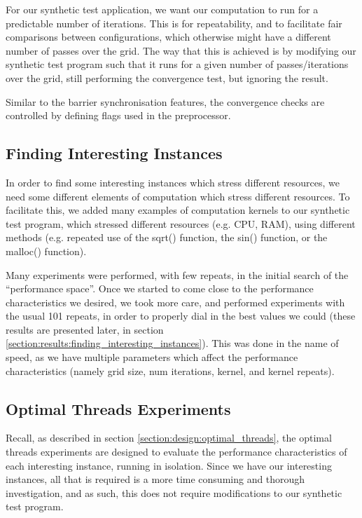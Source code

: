 For our synthetic test application, we want our computation to run for a predictable number of iterations. This is for repeatability, and to facilitate fair comparisons between configurations, which otherwise might have a different number of passes over the grid. The way that this is achieved is by modifying our synthetic test program such that it runs for a given number of passes/iterations over the grid, still performing the convergence test, but ignoring the result.

Similar to the barrier synchronisation features, the convergence checks are controlled by defining flags used in the preprocessor.



\subsection{Finding Interesting Instances}
\label{section:experimental_methodology:finding_interesting_instances}

In order to find some interesting instances which stress different resources, we need some different elements of computation which stress different resources. To facilitate this, we added many examples of computation kernels to our synthetic test program, which stressed different resources (e.g. CPU, RAM), using different methods (e.g. repeated use of the sqrt() function, the sin() function, or the malloc() function).

Many experiments were performed, with few repeats, in the initial search of the ``performance space''. Once we started to come close to the performance characteristics we desired, we took more care, and performed experiments with the usual 101 repeats, in order to properly dial in the best values we could (these results are presented later, in section \ref{section:results:finding_interesting_instances}). This was done in the name of speed, as we have multiple parameters which affect the performance characteristics (namely grid size, num iterations, kernel, and kernel repeats).



\subsection{Optimal Threads Experiments}
\label{section:experimental_methodology:optimal_threads_experiments}

Recall, as described in section \ref{section:design:optimal_threads}, the optimal threads experiments are designed to evaluate the performance characteristics of each interesting instance, running in isolation. Since we have our interesting instances, all that is required is a more time consuming and thorough investigation, and as such, this does not require modifications to our synthetic test program. 


